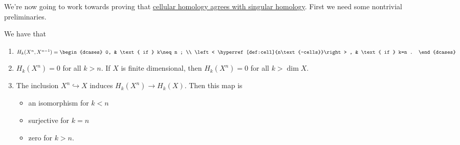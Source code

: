 We're now going to work towards proving that \hyperref[thm:cellular-homology-agrees-with-singular-homology]{cellular homology agrees with singular homology}.
First we need some nontrivial preliminaries.
\begin{lemma}\label{lma:lec34}
	We have that
	\begin{enumerate}[(1)]
		\item \(H_k(X^n, X^{n - 1}) = \begin{dcases}
			      0,                                                  & \text{ if } k\neq n ; \\
			      \left< \hyperref[def:cell]{n\text{-cells}}\right> , & \text{ if } k=n .
		      \end{dcases}\)
		\item \(H_k(X^n) = 0\) for all \(k > n\). If \(X\) is finite dimensional, then \(H_k(X^n) = 0\) for all \(k > \dim X\).
		\item The inclusion \(X^n \hookrightarrow X\) induces \(H_k(X^n) \to H_k(X)\). Then this map is
		      \begin{itemize}
			      \item an isomorphism for \(k < n\)
			      \item surjective for \(k = n\)
			      \item zero for \(k > n\).
		      \end{itemize}
	\end{enumerate}
\end{lemma}
